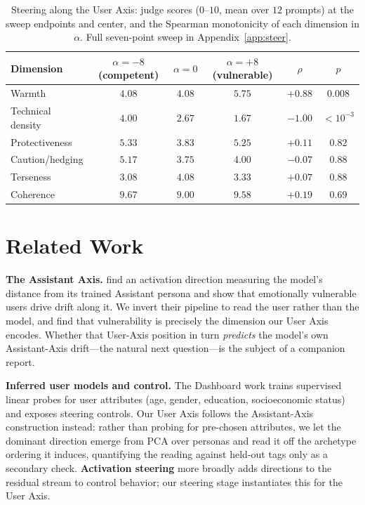\documentclass{article}
\begin{document}
\begin{table}[t]
\centering
\small
\caption{Steering along the User Axis: judge scores ($0$--$10$, mean over $12$
prompts) at the sweep endpoints and center, and the Spearman monotonicity of each
dimension in $\alpha$. Full seven-point sweep in Appendix~\ref{app:steer}.}
\label{tab:steer-main}
\begin{tabular}{lccccc}
\toprule
\textbf{Dimension} & $\alpha{=}{-}8$ (competent) & $\alpha{=}0$ & $\alpha{=}{+}8$ (vulnerable) & $\rho$ & $p$ \\
\midrule
Warmth            & $4.08$ & $4.08$ & $\mathbf{5.75}$ & $+0.88$ & $0.008$ \\
Technical density & $\mathbf{4.00}$ & $2.67$ & $1.67$ & $-1.00$ & $<10^{-3}$ \\
Protectiveness    & $5.33$ & $3.83$ & $5.25$ & $+0.11$ & $0.82$ \\
Caution/hedging   & $5.17$ & $3.75$ & $4.00$ & $-0.07$ & $0.88$ \\
Terseness         & $3.08$ & $4.08$ & $3.33$ & $+0.07$ & $0.88$ \\
Coherence         & $9.67$ & $9.00$ & $9.58$ & $+0.19$ & $0.69$ \\
\bottomrule
\end{tabular}
\end{table}

\section{Related Work}
\textbf{The Assistant Axis.} \citet{lu2024assistant} find an activation direction
measuring the model's distance from its trained Assistant persona and show that
emotionally vulnerable users drive drift along it. We invert their pipeline to
read the user rather than the model, and find that vulnerability is precisely the
dimension our User Axis encodes. Whether that User-Axis position in turn
\emph{predicts} the model's own Assistant-Axis drift---the natural next question---is
the subject of a companion report.

\textbf{Inferred user models and control.} The Dashboard work
\citep{viegas2023dashboard} trains supervised linear probes for user attributes
(age, gender, education, socioeconomic status) and exposes steering controls. Our
User Axis follows the Assistant-Axis construction instead: rather than probing for
pre-chosen attributes, we let the dominant direction emerge from PCA over personas
and read it off the archetype ordering it induces, quantifying the reading against
held-out tags only as a secondary check. \textbf{Activation steering} more broadly
\citep{turner2023steering,zou2023representation} adds directions to the residual
stream to control behavior; our steering stage instantiates this for the User
Axis.
\end{document}
